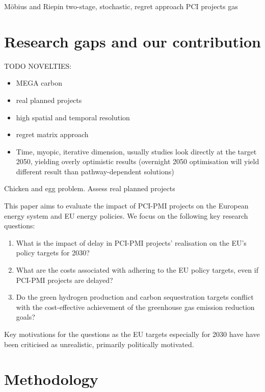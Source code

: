\documentclass[preprint,12pt,sort&compress]{elsarticle}
\begin{document}
Möbius and Riepin two-stage, stochastic, regret approach  \cite{mobiusRegretAnalysisInvestment2020a}
PCI projects gas

\section{Research gaps and our contribution}

TODO NOVELTIES:
\begin{itemize}
  \item MEGA carbon
  \item real planned projects
  \item high spatial and temporal resolution
  \item regret matrix approach
  \item Time, myopic, iterative dimension, usually studies look directly at the target 2050, yielding overly optimistic results (overnight 2050 optimisation will yield different result than pathway-dependent solutions)
\end{itemize}

Chicken and egg problem. Assess real planned projects

This paper aims to evaluate the impact of PCI-PMI projects on the European energy system and EU energy policies. We focus on the following key research questions:

\begin{enumerate} 
  \item What is the impact of delay in PCI-PMI projects' realisation on the EU's policy targets for 2030?
  \item What are the costs associated with adhering to the EU policy targets, even if PCI-PMI projects are delayed? 
  \item Do the green hydrogen production and carbon sequestration targets conflict with the cost-effective achievement of the greenhouse gas emission reduction goals? 
\end{enumerate}

Key motivations for the questions as the EU targets especially for 2030 have have been criticised as unrealistic, primarily politically motivated. \cite{europeancourtofauditorsEUsIndustrialPolicy2024,greevenbroekLittleLoseCase2024}


\newpage
\section{Methodology}
\label{sec:methodology}
\end{document}
